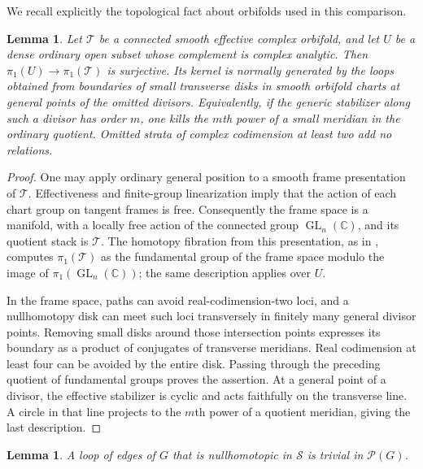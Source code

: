 \documentclass[11pt,reqno]{amsart}
\numberwithin{equation}{section}
\newtheorem{lemma}[theorem]{Lemma}
\theoremstyle{definition}
\theoremstyle{remark}
\begin{document}
We recall explicitly the topological fact about orbifolds used in
this comparison.

\begin{lemma}\label{app:orbifold-meridians}
Let $\mathcal T$ be a connected smooth effective complex orbifold, and
let $U$ be a dense ordinary open subset whose complement is complex
analytic.  Then $\pi_1(U)\to\pi_1(\mathcal T)$ is surjective.  Its
kernel is normally generated by the loops obtained from boundaries
of small transverse disks in smooth orbifold charts at general
points of the omitted divisors.  Equivalently, if the generic
stabilizer along such a divisor has order $m$, one kills the $m$th
power of a small meridian in the ordinary quotient.  Omitted strata
of complex codimension at least two add no relations.
\end{lemma}

\begin{proof}
One may apply ordinary general position to a smooth frame
presentation of $\mathcal T$.  Effectiveness and finite-group
linearization imply that the action of each chart group on tangent
frames is free.  Consequently the frame space is a manifold, with a
locally free action of the connected group $\operatorname{GL}_n(\mathbb C)$,
and its quotient stack is $\mathcal T$.  The homotopy fibration from
this presentation, as in \cite[Example~5.6]{Noohi2014}, computes $\pi_1(\mathcal T)$ as the fundamental
group of the frame space modulo the image of
$\pi_1(\operatorname{GL}_n(\mathbb C))$; the same description applies over
$U$.

In the frame space, paths can avoid real-codimension-two loci, and a
nullhomotopy disk can meet such loci transversely in finitely many
general divisor points.  Removing small disks around those
intersection points expresses its boundary as a product of
conjugates of transverse meridians.  Real codimension at least four
can be avoided by the entire disk.  Passing through the preceding
quotient of fundamental groups proves the assertion.  At a general
point of a divisor, the effective stabilizer is cyclic and acts
faithfully on the transverse line.  A circle in that line projects
to the $m$th power of a quotient meridian, giving the last description.
\end{proof}

\begin{lemma}\label{app:true-relations}
A loop of edges of $G$ that is nullhomotopic in $\mathcal S$ is trivial in
$\mathcal P(G)$.
\end{lemma}
\end{document}
